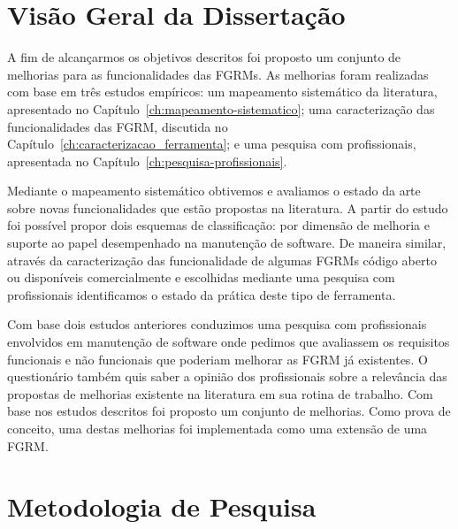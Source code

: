 
\section{Visão Geral da Dissertação}
\label{sec:intro-visao-geral}

A fim de alcançarmos os objetivos descritos foi proposto um conjunto de
melhorias para as funcionalidades das FGRMs. As melhorias foram realizadas com
base em três estudos empíricos: um mapeamento sistemático da literatura,
apresentado no Capítulo~\ref{ch:mapeamento-sistematico}; uma caracterização das
funcionalidades das FGRM, discutida no
Capítulo~\ref{ch:caracterizacao_ferramenta}; e uma pesquisa com profissionais,
apresentada no Capítulo~\ref{ch:pesquisa-profissionais}.

Mediante o mapeamento sistemático obtivemos e avaliamos o estado da arte sobre
novas funcionalidades que estão propostas na literatura. A partir do estudo foi
possível propor dois esquemas de classificação: por dimensão de melhoria e
suporte ao papel desempenhado na manutenção de software. De maneira similar,
através da caracterização das funcionalidade de algumas FGRMs código aberto ou
disponíveis comercialmente e escolhidas mediante uma pesquisa com profissionais
identificamos o estado da prática deste tipo de ferramenta.

Com base dois estudos anteriores conduzimos uma pesquisa com profissionais
envolvidos em manutenção de software onde pedimos que avaliassem os requisitos
funcionais e não funcionais que poderiam melhorar as FGRM já existentes. O
questionário também quis saber a opinião dos profissionais sobre a relevância
das propostas de me\-lho\-ri\-as existente na literatura em sua rotina de
trabalho. Com base nos estudos descritos foi proposto um conjunto de melhorias.
Como prova de conceito, uma destas melhorias foi implementada como uma extensão
de uma FGRM\@.

\section{Metodologia de Pesquisa}
\label{sec:intro-metodologia}

